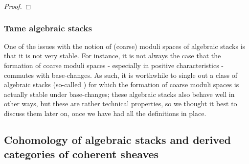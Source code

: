             \begin{theorem} \label{theorem: keel_mori_theorem_on_the_existence_of_coarse_moduli_spaces}
                
            \end{theorem}
                \begin{proof}
                    
                \end{proof}
        
        \subsubsection{Tame algebraic stacks}
            One of the issues with the notion of (coarse) moduli spaces of algebraic stacks is that it is not very stable. For instance, it is not always the case that the formation of coarse moduli spaces - especially in positive characteristics - commutes with base-changes. As such, it is worthwhile to single out a class of algebraic stacks (so-called ) for which the formation of coarse moduli spaces is actually stable under base-changes; these algebraic stacks also behave well in other ways, but these are rather technical properties, so we thought it best to discuss them later on, once we have had all the definitions in place. 

    \subsection{Cohomology of algebraic stacks and derived categories of coherent sheaves}